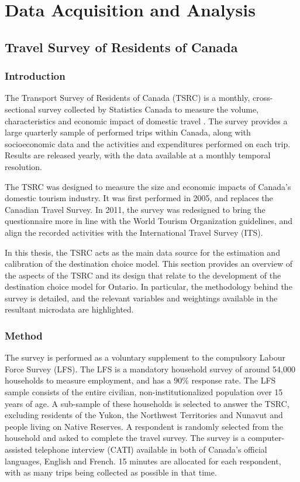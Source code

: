 \chapter{Data Acquisition and Analysis}

\section{Travel Survey of Residents of Canada}

\subsection{Introduction}
The Transport Survey of Residents of Canada (TSRC) is a monthly, cross-sectional survey collected by Statistics Canada to measure the volume, characteristics and economic impact of domestic travel \nocite{tsrc}. The survey provides a large quarterly sample of performed trips within Canada, along with socioeconomic data and the activities and expenditures performed on each trip. Results are released yearly, with the data available at a monthly temporal resolution. 

The TSRC was designed to measure the size and economic impacts of Canada's domestic tourism industry. It was first performed in 2005, and replaces the Canadian Travel Survey. In 2011, the survey was redesigned to bring the questionnaire more in line with the World Tourism Organization guidelines, and align the recorded activities with the International Travel Survey (ITS). 

In this thesis, the TSRC acts as the main data source for the estimation and calibration of the destination choice model. This section provides an overview of the aspects of the TSRC and its design that relate to the development of the destination choice model for Ontario. In particular, the methodology behind the survey is detailed, and the relevant variables and weightings available in the resultant microdata are highlighted.

\subsection{Method}
The survey is performed as a voluntary supplement to the compulsory Labour Force Survey (LFS). The LFS is a mandatory household survey of around 54,000 households to measure employment, and has a 90\% response rate. The LFS sample consists of the entire civilian, non-institutionalized population over 15 years of age. A sub-sample of these households is selected to answer the TSRC, excluding residents of the Yukon, the Northwest Territories and Nunavut and people living on Native Reserves. A respondent is randomly selected from the household and asked to complete the travel survey. The survey is a computer-assisted telephone interview (CATI) available in both of Canada's official languages, English and French. 15 minutes are allocated for each respondent, with as many trips being collected as possible in that time.

